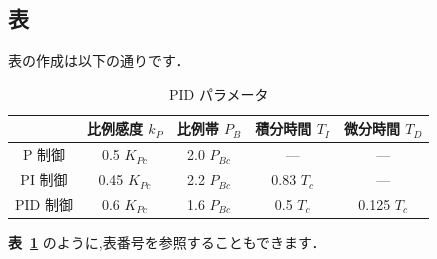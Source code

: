 \subsection{表}
表の作成は以下の通りです．
\begin{table}[H]
  \centering
  \caption{PID パラメータ}
  \label{table:table01}
  \begin{tabular}{|c|c|c|c|c|}
    \hline
                         & 
    比例感度 \({k}_{P}\) & 
    比例帯 \({P}_{B}\)   & 
    積分時間 \({T}_{I}\) & 
    微分時間 \({T}_{D}\)    \\ \hline
    P 制御               & 
    0.5 \({K}_{Pc}\)     & 
    2.0 \({P}_{Bc}\)     & 
    ---                  & 
    ---                     \\ \hline
    PI 制御              & 
    0.45 \({K}_{Pc}\)    & 
    2.2 \({P}_{Bc}\)     & 
    0.83 \({T}_{c}\)     & 
    ---                     \\ \hline
    PID 制御             & 
    0.6 \({K}_{Pc}\)     & 
    1.6 \({P}_{Bc}\)     & 
    0.5 \({T}_{c}\)      & 
    0.125 \({T}_{c}\)       \\ \hline
  \end{tabular}
\end{table}

\textbf{表~\ref{table:table01}} のように,表番号を参照することもできます．